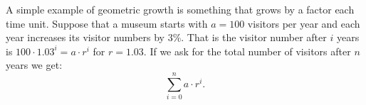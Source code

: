 A simple example of geometric growth is something that grows by a factor
each time unit. Suppose that a museum starts with
$a=100$ visitors per year and each year increases its visitor numbers by
$3\%$. That is the visitor number after $i$ years is $100\cdot 1.03^i=a\cdot
r^i$ for $r=1.03$. 
If we ask for the total number of visitors after $n$ years we get:
\[
\sum_{i=0}^n a\cdot r^i.
\]

%
%

